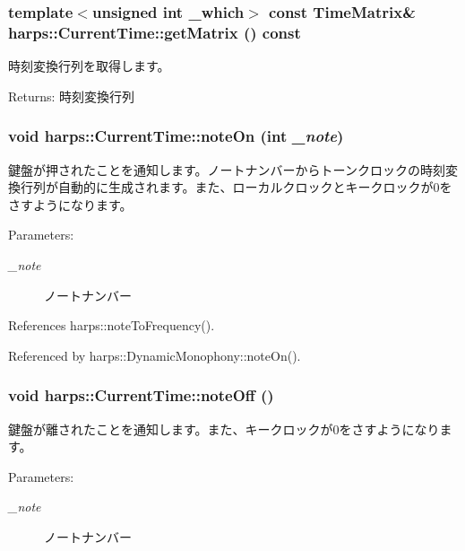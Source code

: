 \subsubsection[getMatrix]{\setlength{\rightskip}{0pt plus 5cm}template$<$unsigned int \_\-which$>$ const TimeMatrix\& harps::CurrentTime::getMatrix () const\hspace{0.3cm}{\tt  [inline]}}\label{classharps_1_1CurrentTime_b7d1435e1b3d59c6a71b6d85c3743d3c}


時刻変換行列を取得します。 \begin{Desc}
\item[Returns:]時刻変換行列 \end{Desc}
\subsubsection[noteOn]{\setlength{\rightskip}{0pt plus 5cm}void harps::CurrentTime::noteOn (int {\em \_\-note})\hspace{0.3cm}{\tt  [inline]}}\label{classharps_1_1CurrentTime_17506ab95e4f9dd773489478751f39d4}


鍵盤が押されたことを通知します。ノートナンバーからトーンクロックの時刻変換行列が自動的に生成されます。また、ローカルクロックとキークロックが0をさすようになります。 \begin{Desc}
\item[Parameters:]
\begin{description}
\item[{\em \_\-note}]ノートナンバー \end{description}
\end{Desc}


References harps::noteToFrequency().

Referenced by harps::DynamicMonophony::noteOn().
\subsubsection[noteOff]{\setlength{\rightskip}{0pt plus 5cm}void harps::CurrentTime::noteOff ()\hspace{0.3cm}{\tt  [inline]}}\label{classharps_1_1CurrentTime_d4ba06019a3066b8aa29bb3a789d9e5d}


鍵盤が離されたことを通知します。また、キークロックが0をさすようになります。 \begin{Desc}
\item[Parameters:]
\begin{description}
\item[{\em \_\-note}]ノートナンバー \end{description}
\end{Desc}


